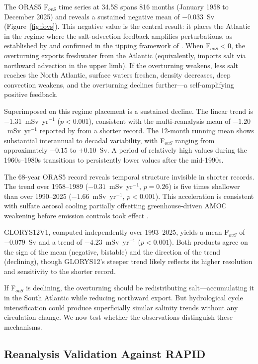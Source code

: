 \documentclass{agujournal2019}
\begin{document}
The ORAS5 F$_{ovS}$ time series at 34.5\textdegree S spans 816 months (January 1958 to December 2025) and reveals a sustained negative mean of $-0.033$~Sv (Figure~\ref{fig:fovs}). This negative value is the central result: it places the Atlantic in the regime where the salt-advection feedback amplifies perturbations, as established by  and confirmed in the tipping framework of . When F$_{ovS} < 0$, the overturning exports freshwater from the Atlantic (equivalently, imports salt via northward advection in the upper limb). If the overturning weakens, less salt reaches the North Atlantic, surface waters freshen, density decreases, deep convection weakens, and the overturning declines further---a self-amplifying positive feedback.

Superimposed on this regime placement is a sustained decline. The linear trend is $-1.31$~mSv~yr$^{-1}$ ($p < 0.001$), consistent with the multi-reanalysis mean of $-1.20$~mSv~yr$^{-1}$ reported by  from a shorter record. The 12-month running mean shows substantial interannual to decadal variability, with F$_{ovS}$ ranging from approximately $-0.15$ to $+0.10$~Sv. A period of relatively high values during the 1960s--1980s transitions to persistently lower values after the mid-1990s.

The 68-year ORAS5 record reveals temporal structure invisible in shorter records. The trend over 1958--1989 ($-0.31$~mSv~yr$^{-1}$, $p = 0.26$) is five times shallower than over 1990--2025 ($-1.66$~mSv~yr$^{-1}$, $p < 0.001$). This acceleration is consistent with sulfate aerosol cooling partially offsetting greenhouse-driven AMOC weakening before emission controls took effect \cite{Booth2012}.

GLORYS12V1, computed independently over 1993--2025, yields a mean F$_{ovS}$ of $-0.079$~Sv and a trend of $-4.23$~mSv~yr$^{-1}$ ($p < 0.001$). Both products agree on the sign of the mean (negative, bistable) and the direction of the trend (declining), though GLORYS12's steeper trend likely reflects its higher resolution and sensitivity to the shorter record.

If F$_{ovS}$ is declining, the overturning should be redistributing salt---accumulating it in the South Atlantic while reducing northward export. But hydrological cycle intensification could produce superficially similar salinity trends without any circulation change. We now test whether the observations distinguish these mechanisms.

\subsection{Reanalysis Validation Against RAPID}
\end{document}
